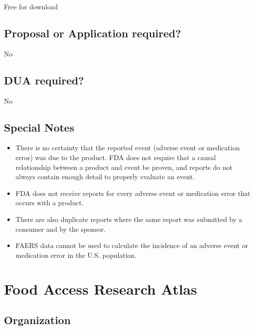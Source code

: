 \documentclass[
]{book}
\providecommand{\tightlist}{%
  \setlength{\itemsep}{0pt}\setlength{\parskip}{0pt}}
\begin{document}
Free for download

\hypertarget{proposal-or-application-required-25}{%
\section{Proposal or Application required?}\label{proposal-or-application-required-25}}

No

\hypertarget{dua-required-25}{%
\section{DUA required?}\label{dua-required-25}}

No

\hypertarget{special-notes-25}{%
\section{Special Notes}\label{special-notes-25}}

\begin{itemize}
\tightlist
\item
  There is no certainty that the reported event (adverse event or medication error) was due to the product. FDA does not require that a causal relationship between a product and event be proven, and reports do not always contain enough detail to properly evaluate an event.
\item
  FDA does not receive reports for every adverse event or medication error that occurs with a product.
\item
  There are also duplicate reports where the same report was submitted by a consumer and by the sponsor.
\item
  FAERS data cannot be used to calculate the incidence of an adverse event or medication error in the U.S. population.
\end{itemize}

\mainmatter

\hypertarget{food-access-research-atlas}{%
\chapter{Food Access Research Atlas}\label{food-access-research-atlas}}

\hypertarget{organization-26}{%
\section{Organization}\label{organization-26}}
\end{document}
